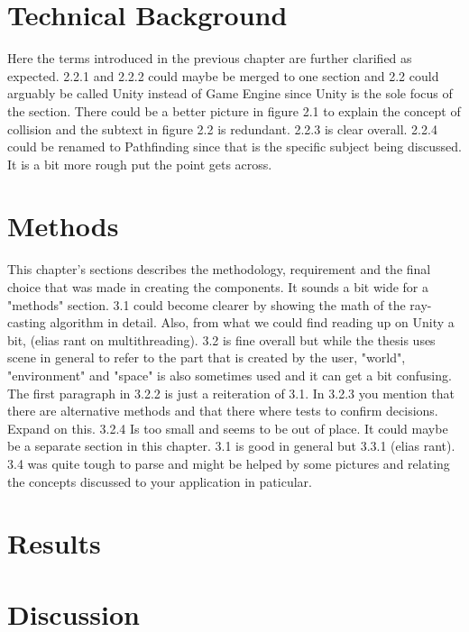 \documentclass[12pt,a4paper,twoside,openright]{report}
\begin{document}
\section*{Technical Background}

Here the terms introduced in the previous chapter are further clarified as
expected. 2.2.1 and 2.2.2 could maybe be merged to one section and 2.2 could
arguably be called Unity instead of Game Engine since Unity is the sole focus
of the section. There could be a better picture in figure 2.1 to explain the
concept of collision and the subtext in figure 2.2 is redundant. 2.2.3 is clear
overall. 2.2.4 could be renamed to Pathfinding since that is the specific
subject being discussed. It is a bit more rough put the point gets across.

\section*{Methods}

This chapter's sections describes the methodology, requirement and the final
choice that was made in creating the components. It sounds a bit wide for a
"methods" section. 3.1 could become clearer by showing the math of the
ray-casting algorithm in detail. Also, from what we could find reading up on
Unity a bit, (elias rant on multithreading). 3.2 is fine overall but while the
thesis uses scene in general to refer to the part that is created by the user,
"world", "environment" and "space" is also sometimes used and it can get a bit
confusing. The first paragraph in 3.2.2 is just a reiteration of 3.1. In 3.2.3
you mention that there are alternative methods and that there where tests to
confirm decisions. Expand on this. 3.2.4 Is too small and seems to be out of
place. It could maybe be a separate section in this chapter. 3.1 is good in
general but 3.3.1 (elias rant). 3.4 was quite tough to parse and might be
helped by some pictures and relating the concepts discussed to your application
in paticular.

\section*{Results}


\section*{Discussion}
\end{document}
